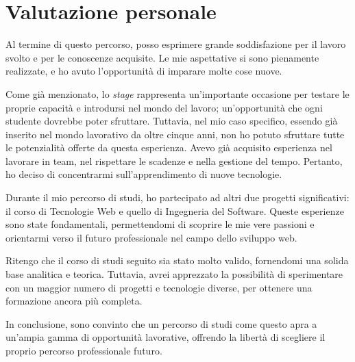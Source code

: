 \section{Valutazione personale}
Al termine di questo percorso, posso esprimere grande soddisfazione per il lavoro svolto e per le conoscenze acquisite. 
Le mie aspettative si sono pienamente realizzate, e ho avuto l'opportunità di imparare molte cose nuove.

Come già menzionato, lo \textit{stage} rappresenta un'importante occasione per testare le proprie capacità 
e introdursi nel mondo del lavoro; un'opportunità che ogni studente dovrebbe poter sfruttare. 
Tuttavia, nel mio caso specifico, essendo già inserito nel mondo lavorativo da oltre cinque anni, 
non ho potuto sfruttare tutte le potenzialità offerte da questa esperienza. Avevo già acquisito esperienza 
nel lavorare in team, nel rispettare le scadenze e nella gestione del tempo. 
Pertanto, ho deciso di concentrarmi sull'apprendimento di nuove tecnologie.

Durante il mio percorso di studi, ho partecipato ad altri due progetti significativi: 
il corso di Tecnologie Web e quello di Ingegneria del Software. Queste esperienze sono state fondamentali, 
permettendomi di scoprire le mie vere passioni e orientarmi verso il futuro professionale nel campo dello sviluppo web.

Ritengo che il corso di studi seguito sia stato molto valido, fornendomi una solida base analitica e teorica. 
Tuttavia, avrei apprezzato la possibilità di sperimentare con un maggior numero di progetti e tecnologie diverse, 
per ottenere una formazione ancora più completa.

In conclusione, sono convinto che un percorso di studi come questo apra a un'ampia gamma di opportunità lavorative, 
offrendo la libertà di scegliere il proprio percorso professionale futuro.